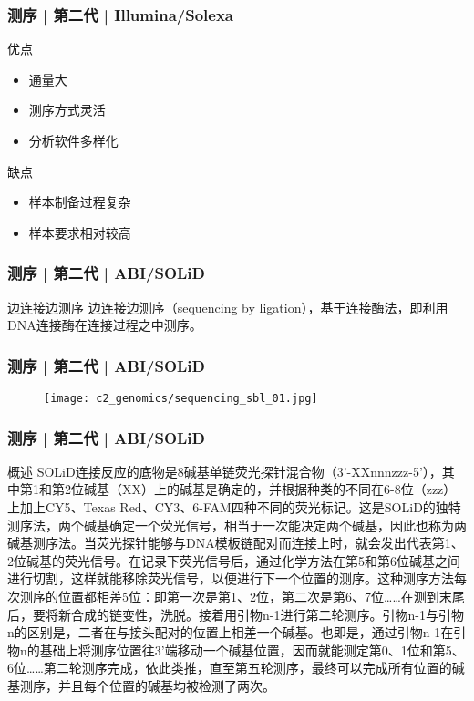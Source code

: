 \begin{frame}
  \frametitle{测序 | 第二代 | Illumina/Solexa}
  \begin{block}{优点}
    \begin{itemize}
      \item 通量大
      \item 测序方式灵活
      \item 分析软件多样化
    \end{itemize}
  \end{block}
  \pause
  \begin{block}{缺点}
    \begin{itemize}
      \item 样本制备过程复杂
      \item 样本要求相对较高
    \end{itemize}
  \end{block}
\end{frame}

\begin{frame}
  \frametitle{测序 | 第二代 | ABI/SOLiD}
  \begin{block}{边连接边测序}
边连接边测序（sequencing by ligation），基于连接酶法，即利用DNA连接酶在连接过程之中测序。
  \end{block}
\end{frame}

\begin{frame}
  \frametitle{测序 | 第二代 | ABI/SOLiD}
  \begin{figure}
    \centering
    \texttt{[image: c2\_genomics/sequencing\_sbl\_01.jpg]}
  \end{figure}
\end{frame}

\begin{frame}
  \frametitle{测序 | 第二代 | ABI/SOLiD}
  \begin{block}{概述}
SOLiD连接反应的底物是8碱基单链荧光探针混合物（3'-XXnnnzzz-5'），其中第1和第2位碱基（XX）上的碱基是确定的，并根据种类的不同在6-8位（zzz）上加上CY5、Texas Red、CY3、6-FAM四种不同的荧光标记。这是SOLiD的独特测序法，两个碱基确定一个荧光信号，相当于一次能决定两个碱基，因此也称为两碱基测序法。当荧光探针能够与DNA模板链配对而连接上时，就会发出代表第1、2位碱基的荧光信号。在记录下荧光信号后，通过化学方法在第5和第6位碱基之间进行切割，这样就能移除荧光信号，以便进行下一个位置的测序。这种测序方法每次测序的位置都相差5位：即第一次是第1、2位，第二次是第6、7位……在测到末尾后，要将新合成的链变性，洗脱。接着用引物n-1进行第二轮测序。引物n-1与引物n的区别是，二者在与接头配对的位置上相差一个碱基。也即是，通过引物n-1在引物n的基础上将测序位置往3'端移动一个碱基位置，因而就能测定第0、1位和第5、6位……第二轮测序完成，依此类推，直至第五轮测序，最终可以完成所有位置的碱基测序，并且每个位置的碱基均被检测了两次。
  \end{block}
\end{frame}

